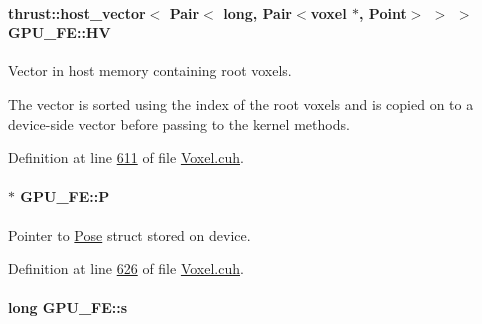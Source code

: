 \paragraph[{\texorpdfstring{HV}{HV}}]{\setlength{\rightskip}{0pt plus 5cm}thrust\+::host\+\_\+vector$<$ {\bf Pair}$<$ long, {\bf Pair}$<${\bf voxel} $\ast$, {\bf Point}$>$ $>$ $>$ G\+P\+U\+\_\+\+F\+E\+::\+HV\hspace{0.3cm}{\ttfamily [private]}}\hypertarget{classGPU__FE_a7418d50e4e22db3671d9c000344aaddc}{}\label{classGPU__FE_a7418d50e4e22db3671d9c000344aaddc}


Vector in host memory containing root voxels. 

The vector is sorted using the index of the root voxels and is copied on to a device-\/side vector before passing to the kernel methods. 

Definition at line \hyperlink{Voxel_8cuh_source_l00611}{611} of file \hyperlink{Voxel_8cuh_source}{Voxel.\+cuh}.

\paragraph[{\texorpdfstring{P}{P}}]{$\ast$ G\+P\+U\+\_\+\+F\+E\+::P\hspace{0.3cm}{\ttfamily [private]}}\hypertarget{classGPU__FE_a1a99fc5bf3cc72c1d39f779e632f5fe7}{}\label{classGPU__FE_a1a99fc5bf3cc72c1d39f779e632f5fe7}


Pointer to \hyperlink{structPose}{Pose} struct stored on device. 



Definition at line \hyperlink{Voxel_8cuh_source_l00626}{626} of file \hyperlink{Voxel_8cuh_source}{Voxel.\+cuh}.

\paragraph[{\texorpdfstring{s}{s}}]{\setlength{\rightskip}{0pt plus 5cm}long G\+P\+U\+\_\+\+F\+E\+::s\hspace{0.3cm}{\ttfamily [private]}}\hypertarget{classGPU__FE_a0bd3424bf1e7775fc5eef2d17714cd94}{}\label{classGPU__FE_a0bd3424bf1e7775fc5eef2d17714cd94}


